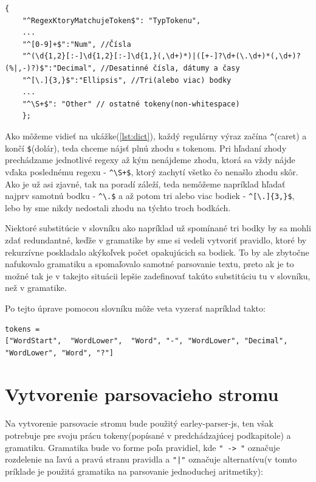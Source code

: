\documentclass[12pt,a4paper]{report}
\theoremstyle{definition}
\theoremstyle{remark}
\begin{document}
\begin{lstlisting}[caption={Formát slovníku a príklad substitúcie},label={lst:dict},style=htmlcssjs]
	{
	"^RegexKtoryMatchujeToken$": "TypTokenu",
	...
	"^[0-9]+$":"Num", //Čísla
	"^(\d{1,2}[:-]\d{1,2}[:-]\d{1,}(,\d+)*)|([+-]?\d+(\.\d+)*(,\d+)?(%|,-)?)$":"Decimal", //Desatinné čísla, dátumy a časy
	"^[\.]{3,}$":"Ellipsis", //Tri(alebo viac) bodky
	...
	"^\S+$": "Other" // ostatné tokeny(non-whitespace)
	};
\end{lstlisting}
\bigskip
Ako môžeme vidieť na ukážke(\ref{lst:dict}), každý regulárny výraz začína \verb!^!(caret) a končí \verb!$!(dolár), teda chceme nájsť plnú zhodu s tokenom. Pri hľadaní zhody prechádzame jednotlivé regexy až kým nenájdeme zhodu, ktorá sa vždy nájde vďaka poslednému regexu - \verb!^\S+$!, ktorý zachytí všetko čo nenašlo zhodu skôr. Ako je už asi zjavné, tak na poradí záleží, teda nemôžeme napríklad hľadať najprv samotnú bodku - \verb!^\.$! a až potom tri alebo viac bodiek -  \verb!^[\.]{3,}$!, lebo by sme nikdy nedostali zhodu na týchto troch bodkách.

 Niektoré substitúcie v slovníku ako napríklad už spomínané tri bodky by sa mohli zdať redundantné, keďže v gramatike by sme si vedeli vytvoriť pravidlo, ktoré by rekurzívne poskladalo akýkoľvek počet opakujúcich sa bodiek. To by ale zbytočne nafukovalo gramatiku a spomaľovalo samotné parsovanie textu, preto ak je to možné tak je v takejto situácii lepšie zadefinovať takúto substitúciu tu v slovníku, než v gramatike. 
 
 
\bigskip


\noindent Po tejto úprave pomocou slovníku môže veta vyzerať napríklad takto:
\begin{lstlisting}[caption={Tokeny po použití slovníku},style=htmlcssjs]
tokens = 
["WordStart",  "WordLower",  "Word", "-", "WordLower", "Decimal", "WordLower", "Word", "?"]
\end{lstlisting}

\section{Vytvorenie parsovacieho stromu}
Na vytvorenie parsovacie stromu bude použitý earley-parser-js, ten však potrebuje pre svoju prácu tokeny(popísané v predchádzajúcej podkapitole) a gramatiku. Gramatika bude vo forme poľa pravidiel, kde \verb!" -> "! označuje rozdelenie na ľavú a pravú stranu pravidla a \verb!"|"! označuje alternatívu(v tomto príklade je použitá gramatika na parsovanie jednoduchej aritmetiky):
\end{document}
